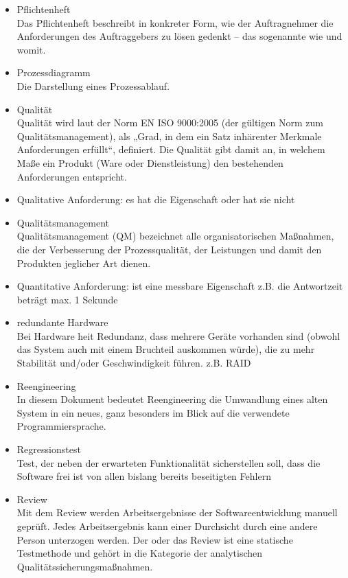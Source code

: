 \begin{itemize}
\item 	Pflichtenheft\\Das Pflichtenheft beschreibt in konkreter Form, wie der Auftragnehmer die Anforderungen des Auftraggebers zu lösen gedenkt – das sogenannte wie und womit.
\item 	Prozessdiagramm\\Die Darstellung eines Prozessablauf.
\item 	Qualität\\
Qualität wird laut der Norm EN ISO 9000:2005 (der gültigen Norm zum Qualitätsmanagement), als „Grad, in dem ein Satz inhärenter Merkmale Anforderungen erfüllt“, definiert. Die Qualität gibt damit an, in welchem Maße ein Produkt (Ware oder Dienstleistung) den bestehenden Anforderungen entspricht.
\item 	Qualitative Anforderung: es hat die Eigenschaft oder hat sie nicht
\item 	Qualitätsmanagement\\
Qualitätsmanagement (QM) bezeichnet alle organisatorischen Maßnahmen, die der Verbesserung der Prozessqualität, der Leistungen und damit den Produkten jeglicher Art dienen. 
\item 	Quantitative Anforderung: ist eine messbare Eigenschaft z.B. die Antwortzeit beträgt max. 1 Sekunde
\item 	redundante Hardware\\
Bei Hardware heit Redundanz, dass mehrere Geräte vorhanden sind (obwohl das System auch mit einem Bruchteil auskommen würde), die zu mehr Stabilität und/oder Geschwindigkeit führen. z.B. RAID
\item 	Reengineering\\
In diesem Dokument bedeutet Reengineering die Umwandlung eines alten System in ein neues, ganz besonders im Blick auf die verwendete Programmiersprache.
\item 	Regressionstest \\
Test, der neben der erwarteten Funktionalität sicherstellen soll, dass die Software frei ist von allen bislang bereits beseitigten Fehlern
\item 	Review\\
Mit dem Review werden Arbeitsergebnisse der Softwareentwicklung manuell geprüft. Jedes Arbeitsergebnis kann einer Durchsicht durch eine andere Person unterzogen werden. Der oder das Review ist eine statische Testmethode und gehört in die Kategorie der analytischen Qualitätssicherungsmaßnahmen.


\end{itemize}
